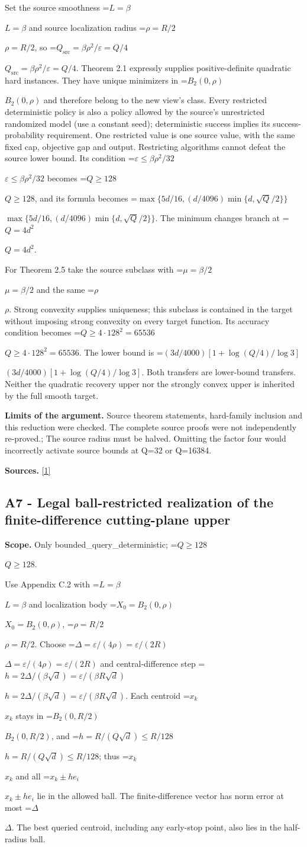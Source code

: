 \documentclass[10pt,a4paper]{article}
\newcommand{\AtlasMath}[1]{\par\begingroup\centering\setbox0=\hbox{$\displaystyle #1$}\ifdim\wd0>1.4\linewidth\typeout{ATLAS WIDE FORMULA: \the\wd0}\fi\ifdim\wd0>\linewidth\resizebox{\linewidth}{!}{\box0}\else\box0\fi\par\endgroup}
\newcommand{\AtlasInlineMath}[1]{\begingroup\setbox0=\hbox{$#1$}\ifdim\wd0>.4\linewidth\endgroup\AtlasMath{#1}\else\endgroup$#1$\fi}
\begin{document}
Set the source smoothness \AtlasInlineMath{L=\beta} and source localization radius \AtlasInlineMath{\rho=R/2}, so \AtlasInlineMath{Q_{\mathrm{src}}=\beta\rho^2/\varepsilon=Q/4}. Theorem 2.1 expressly supplies positive-definite quadratic hard instances. They have unique minimizers in \AtlasInlineMath{B_2(0,\rho)} and therefore belong to the new view's class. Every restricted deterministic policy is also a policy allowed by the source's unrestricted randomized model (use a constant seed); deterministic success implies its success-probability requirement. One restricted value is one source value, with the same fixed cap, objective gap and output. Restricting algorithms cannot defeat the source lower bound. Its condition \AtlasInlineMath{\varepsilon\le\beta\rho^2/32} becomes \AtlasInlineMath{Q\ge128}, and its formula becomes \AtlasInlineMath{\max\{5d/16,(d/4096)\min\{d,\sqrt Q/2\}\}}. The minimum changes branch at \AtlasInlineMath{Q=4d^2}.

For Theorem 2.5 take the source subclass with \AtlasInlineMath{\mu=\beta/2} and the same \AtlasInlineMath{\rho}. Strong convexity supplies uniqueness; this subclass is contained in the target without imposing strong convexity on every target function. Its accuracy condition becomes \AtlasInlineMath{Q\ge4\cdot128^2=65536}. The lower bound is \AtlasInlineMath{(3d/4000)[1+\log(Q/4)/\log3]}. Both transfers are lower-bound transfers. Neither the quadratic recovery upper nor the strongly convex upper is inherited by the full smooth target.

\textbf{Limits of the argument.} Source theorem statements, hard-family inclusion and this reduction were checked. The complete source proofs were not independently re-proved.; The source radius must be halved. Omitting the factor four would incorrectly activate source bounds at Q=32 or Q=16384.

\textbf{Sources.} \href{https://arxiv.org/html/2610.00345v1}{[1]}

\subsection{A7 - Legal ball-restricted realization of the finite-difference cutting-plane upper}
\textbf{Scope.} Only bounded\_query\_deterministic; \AtlasInlineMath{Q\ge128}.

Use Appendix C.2 with \AtlasInlineMath{L=\beta} and localization body \AtlasInlineMath{X_0=B_2(0,\rho)}, \AtlasInlineMath{\rho=R/2}. Choose \AtlasInlineMath{\Delta=\varepsilon/(4\rho)=\varepsilon/(2R)} and central-difference step \AtlasInlineMath{h=2\Delta/(\beta\sqrt d)=\varepsilon/(\beta R\sqrt d)}. Each centroid \AtlasInlineMath{x_k} stays in \AtlasInlineMath{B_2(0,R/2)}, and \AtlasInlineMath{h=R/(Q\sqrt d)\le R/128}; thus \AtlasInlineMath{x_k} and all \AtlasInlineMath{x_k\pm he_i} lie in the allowed ball. The finite-difference vector has norm error at most \AtlasInlineMath{\Delta}. The best queried centroid, including any early-stop point, also lies in the half-radius ball.
\end{document}
